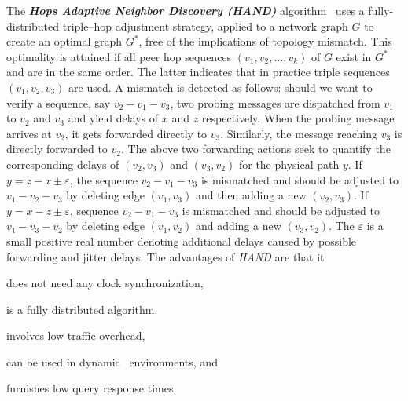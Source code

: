 The \textbf{\emph{Hops Adaptive Neighbor Discovery (HAND)}} algorithm~\cite{CLZHC2006}
uses a fully-distributed triple--hop adjustment strategy, applied to a network
graph $G$ to create an optimal graph $G^{*}$, free of the implications
of topology mismatch. This optimality is attained if all peer hop 
sequences $(v_1, v_2, \ldots, v_k)$ of $G$ exist in $G^{*}$ and are in the same
order. The latter indicates that in practice triple sequences $(v_1, v_2, v_3)$
are used. A mismatch is detected as follows: should we want to verify
a sequence, say $v_2-v_1-v_3$, two probing messages are dispatched from $v_1$ to
$v_2$ and $v_3$ and yield delays of $x$ and $z$ respectively.
%
When the probing message arrives at $v_2$, it gets forwarded
directly to $v_3$. 
Similarly, the message reaching $v_3$ is directly forwarded to $v_2$.
The above two forwarding actions seek to quantify 
the corresponding delays of $(v_2,v_3)$ and $(v_3,v_2)$
for the physical path $y$.
If $y=z-x\pm\varepsilon$, the sequence $v_2-v_1-v_3$ is mismatched and should
be adjusted to $v_1-v_2-v_3$ by deleting edge $(v_1,v_3)$ and 
then adding a new $(v_2,v_3)$. 
If $y=x-z\pm\varepsilon$, sequence $v_2-v_1-v_3$ is mismatched and
should be adjusted to $v_1-v_3-v_2$ by deleting edge $(v_1,v_2)$ and adding a
new $(v_3,v_2)$. 
The  $\varepsilon$ is a small positive real number denoting
additional delays caused by possible forwarding and jitter delays. 
The advantages of \emph{HAND} are that it
\begin{inparaenum}
  \item does not need any clock synchronization,
  \item is a fully distributed algorithm.
  \item involves low traffic overhead,
  \item can be used in dynamic \p\ environments, and 
  \item furnishes low query response times.
\end{inparaenum}
%
%

